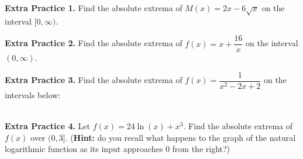 \documentclass[10pt]{article}
\begin{document}
\newpage


{\bf\color{blue}Extra Practice 1.} Find the absolute extrema of $M(x)=2x-6\sqrt{x}$ on the interval $[0,\infty)$.
\vfill

{\bf\color{blue}Extra Practice 2.} Find the absolute extrema of $f(x)=x+\dfrac{16}{x}$ on the interval $(0,\infty)$.


\vfill

{\bf\color{blue}Extra Practice 3.} Find the absolute extrema of $f(x)=\dfrac{1}{x^2-2x+2}$ on the intervals below:\\[0.1in]
%
\,\hfill
%
%
\hfill
%
\fbox{
\begin{minipage}{0.15\textwidth}
\begin{center}
{\Large$\left[-1,2\right)$}
\end{center}
max: \rule[-8pt]{0.5in}{0.4pt}\\[0.2in]
min: \,\rule[-8pt]{0.5in}{0.4pt}
\end{minipage}
}
%
\hfill
%
\fbox{
\begin{minipage}{0.15\textwidth}
\begin{center}
{\Large$\left(-1,2\right]$}
\end{center}
max: \rule[-8pt]{0.5in}{0.4pt}\\[0.2in]
min: \,\rule[-8pt]{0.5in}{0.4pt}
\end{minipage}
}
%
\hfill
%
%
\hfill\,\\[0.2in]
%

\vfill

\newpage%

{\bf\color{blue}Extra Practice 4.} Let $f(x)=24\ln(x)+x^3$. Find the absolute extrema of $f(x)$ over $(0,3]$. ({\bf Hint:} do you recall what happens to the graph of the natural logarithmic function as its input approaches $0$ from the right?)
\end{document}
